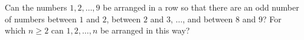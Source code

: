 Can the numbers $1,2,\dots,9$ be arranged in a row so that there are an odd number of numbers between $1$ and $2$, between $2$ and $3$, $\dots$, and between $8$ and $9$? For which $n\ge2$ can $1,2,\dots,n$ be arranged in this way?
